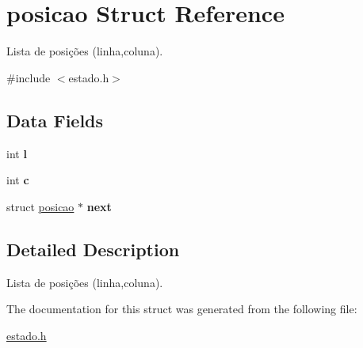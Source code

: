 \hypertarget{structposicao}{}\section{posicao Struct Reference}
\label{structposicao}


Lista de posições (linha,coluna).  




{\ttfamily \#include $<$estado.\+h$>$}

\subsection*{Data Fields}
\begin{DoxyCompactItemize}
\item 
\mbox{\label{structposicao_a89606eca6b563ec68d2da2e84657736f}} 
int {\bfseries l}
\item 
\mbox{\label{structposicao_a4e1e0e72dd773439e333c84dd762a9c3}} 
int {\bfseries c}
\item 
\mbox{\label{structposicao_a7de78b726a8b41ed4e835bedff871c45}} 
struct \hyperlink{structposicao}{posicao} $\ast$ {\bfseries next}
\end{DoxyCompactItemize}


\subsection{Detailed Description}
Lista de posições (linha,coluna). 

The documentation for this struct was generated from the following file\+:\begin{DoxyCompactItemize}
\item 
\hyperlink{estado_8h}{estado.\+h}\end{DoxyCompactItemize}
